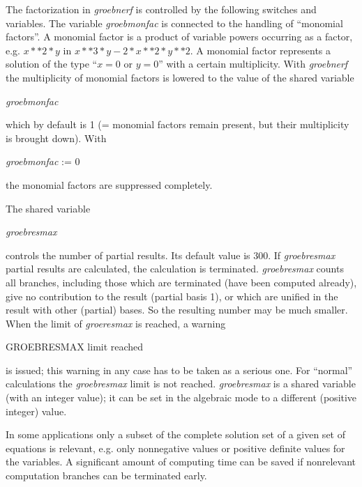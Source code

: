 The factorization in \emph{groebnerf} is controlled by the following
switches and variables.  The variable \emph{groebmonfac} is connected to
the handling of ``monomial factors''.  A monomial factor is a product
of variable powers occurring as a factor, e.g. $ x**2*y$  in  $x**3*y -
2*x**2*y**2$.  A monomial factor represents a solution of the type
``$ x = 0$  or  $y = 0$'' with a certain multiplicity.  With
\emph{groebnerf} 
the multiplicity of monomial factors is lowered to the value of the
shared variable
\begin{center}
 \emph{groebmonfac}
\end{center}
which by default is 1 (= monomial factors remain present, but their
multiplicity is brought down). With
\begin{center}
\emph{groebmonfac} := 0
\end{center}
the monomial factors are suppressed completely.

The shared variable
\begin{center}
\emph{groebresmax}
\end{center}
controls the number of partial results. Its default value is 300. If
\emph{groebresmax} partial results are calculated, the calculation is
terminated. \emph{groebresmax} counts all branches, including those which
are terminated (have been computed already), give no contribution to
the result (partial basis 1), or which are unified in the result with
other (partial) bases. So the resulting number may be much smaller.
When the limit of \emph{groeresmax} is reached, a warning

GROEBRESMAX limit reached

is issued; this warning in any case has to be taken as a serious one.
For ``normal'' calculations the \emph{groebresmax} limit is not reached.
\emph{groebresmax} is a shared variable (with an integer value); it can be
set in the algebraic mode to a different (positive integer) value.

In some applications only a subset of the complete solution set
of a given set of equations is relevant, e.g. only
nonnegative values or positive definite values for the variables.
A significant amount of computing time can be saved if
nonrelevant computation branches can be terminated early.

